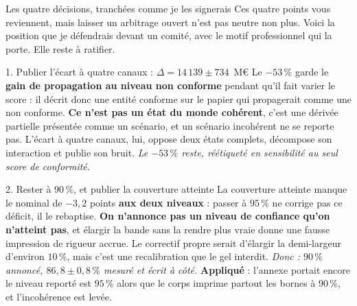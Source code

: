 \documentclass[11pt]{beamer}
\newcommand{\srcs}[1]{\vspace{0.8mm}{\tiny\textcolor{gray!50!black}{Sources : #1}}}
\begin{document}
\begin{frame}{Les quatre décisions, tranchées comme je les signerais}
\scriptsize
Ces quatre points vous reviennent, mais laisser un arbitrage ouvert n'est pas neutre non plus.
Voici la position que je défendrais devant un comité, avec le motif professionnel qui la porte.
Elle reste à ratifier.
\vspace{1.5mm}
\begin{block}{1. Publier l'écart à quatre canaux : $\Delta = 14\,139 \pm 734$~M\euro}
Le $-53\,\%$ garde le \textbf{gain de propagation au niveau non conforme} pendant qu'il fait
varier le score : il décrit donc une entité conforme sur le papier qui propagerait comme une
non conforme. \textbf{Ce n'est pas un état du monde cohérent}, c'est une dérivée partielle
présentée comme un scénario, et un scénario incohérent ne se reporte pas. L'écart à quatre
canaux, lui, oppose deux états complets, décompose son interaction et publie son bruit.
\emph{Le $-53\,\%$ reste, réétiqueté en sensibilité au seul score de conformité.}
\end{block}
\vspace{-1.5mm}
\begin{block}{2. Rester à $90\,\%$, et publier la couverture atteinte}
La couverture atteinte manque le nominal de $-3{,}2$ points \textbf{aux deux niveaux} : passer à
$95\,\%$ ne corrige pas ce déficit, il le rebaptise. \textbf{On n'annonce pas un niveau de confiance qu'on n'atteint
pas}, et élargir la bande sans la rendre plus vraie donne une fausse impression de rigueur
accrue. Le correctif propre serait d'élargir la demi-largeur d'environ $10\,\%$, mais c'est une
recalibration que le gel interdit. \emph{Donc : $90\,\%$ annoncé, $86{,}8 \pm 0{,}8\,\%$ mesuré
et écrit à côté.} \textbf{Appliqué} : l'annexe portait encore \og le niveau reporté est
$95\,\%$ \fg{} alors que le corps imprime partout les bornes à $90\,\%$, et l'incohérence est
levée.
\end{block}
\srcs{scripts~\texttt{25}, \texttt{43}, \texttt{47}, \texttt{72} et~\texttt{74}}
\end{frame}
\end{document}
